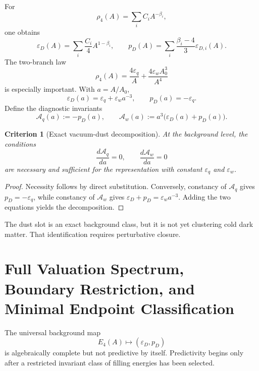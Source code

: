 \documentclass[11pt,a4paper]{article}
\def\dd{d}%
\numberwithin{equation}{section}
\newtheorem{criterion}{Criterion}
\theoremstyle{remark}
\newcommand{\Efour}{E_4}
\newcommand{\rhoFour}{\rho_4}
\newcommand{\epsD}{\varepsilon_D}
\newcommand{\pD}{p_D}
\newcommand{\dd}{\mathrm{d}}
\begin{document}
For
\begin{equation}
\rhoFour(A)=\sum_i C_iA^{-\beta_i},
\end{equation}
one obtains
\begin{equation}
\epsD(A)=\sum_i \frac{C_i}{4}A^{1-\beta_i},
\qquad
\pD(A)=\sum_i \frac{\beta_i-4}{3}\varepsilon_{D,i}(A).
\end{equation}
The two-branch law
\begin{equation}
\rhoFour(A)=\frac{4\varepsilon_q}{A}+\frac{4\varepsilon_wA_0^3}{A^4}
\end{equation}
is especially important. With \(a=A/A_0\),
\begin{equation}
\epsD(a)=\varepsilon_q+\varepsilon_w a^{-3},
\qquad
\pD(a)=-\varepsilon_q.
\end{equation}
Define the diagnostic invariants
\begin{equation}
\mathcal{A}_q(a):=-\pD(a),
\qquad
\mathcal{A}_w(a):=a^3\bigl(\epsD(a)+\pD(a)\bigr).
\end{equation}

\begin{criterion}[Exact vacuum-dust decomposition]
At the background level, the conditions
\begin{equation}
\frac{\dd\mathcal{A}_q}{\dd a}=0,
\qquad
\frac{\dd\mathcal{A}_w}{\dd a}=0
\end{equation}
are necessary and sufficient for the representation with constant \(\varepsilon_q\) and \(\varepsilon_w\).
\end{criterion}
\begin{proof}
Necessity follows by direct substitution. Conversely, constancy of \(\mathcal{A}_q\) gives \(\pD=-\varepsilon_q\), while constancy of \(\mathcal{A}_w\) gives \(\epsD+
\pD=\varepsilon_w a^{-3}\). Adding the two equations yields the decomposition.
\end{proof}

The dust slot is an exact background class, but it is not yet clustering cold dark matter. That identification requires perturbative closure.



\section{Full Valuation Spectrum, Boundary Restriction, and Minimal Endpoint Classification}
The universal background map
\begin{equation}
\Efour(A)\longmapsto(\epsD,\pD)
\end{equation}
is algebraically complete but not predictive by itself. Predictivity begins only after a restricted invariant class of filling energies has been selected.
\end{document}
